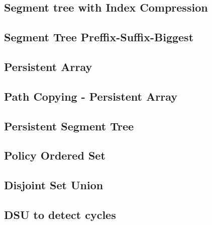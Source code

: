 \documentclass[10pt]{article}
\begin{document}
\begin{multicols*}{2}
\subsection{Segment tree with Index Compression}


\subsection{Segment Tree Preffix-Suffix-Biggest}


\subsection{Persistent Array}



\subsection{Path Copying - Persistent Array}


\subsection{Persistent Segment Tree}


\subsection{Policy Ordered Set}


\subsection{Disjoint Set Union}


\subsection{DSU to detect cycles}



\end{multicols*}
\end{document}

